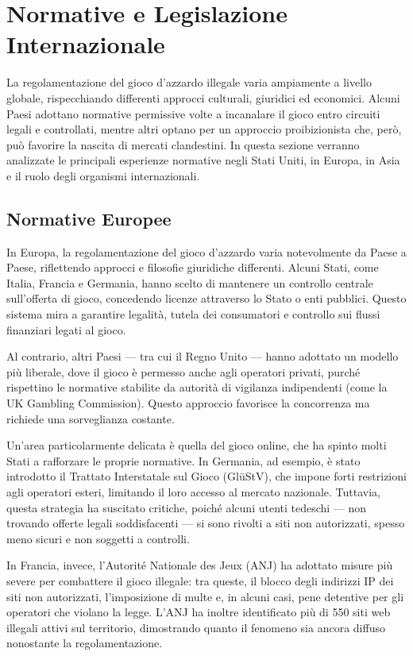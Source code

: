 \documentclass[a4paper,12pt]{article}
\begin{document}
\section{Normative e Legislazione Internazionale}

La regolamentazione del gioco d’azzardo illegale varia ampiamente a livello globale, rispecchiando differenti approcci culturali, giuridici ed economici. Alcuni Paesi adottano normative permissive volte a incanalare il gioco entro circuiti legali e controllati, mentre altri optano per un approccio proibizionista che, però, può favorire la nascita di mercati clandestini. In questa sezione verranno analizzate le principali esperienze normative negli Stati Uniti, in Europa, in Asia e il ruolo degli organismi internazionali.

\subsection{Normative Europee}

In Europa, la regolamentazione del gioco d’azzardo varia notevolmente da Paese a Paese, riflettendo approcci e filosofie giuridiche differenti. Alcuni Stati, come Italia, Francia e Germania, hanno scelto di mantenere un controllo centrale sull’offerta di gioco, concedendo licenze attraverso lo Stato o enti pubblici. Questo sistema mira a garantire legalità, tutela dei consumatori e controllo sui flussi finanziari legati al gioco.

Al contrario, altri Paesi — tra cui il Regno Unito — hanno adottato un modello più liberale, dove il gioco è permesso anche agli operatori privati, purché rispettino le normative stabilite da autorità di vigilanza indipendenti (come la UK Gambling Commission). Questo approccio favorisce la concorrenza ma richiede una sorveglianza costante.

Un’area particolarmente delicata è quella del gioco online, che ha spinto molti Stati a rafforzare le proprie normative. In Germania, ad esempio, è stato introdotto il Trattato Interstatale sul Gioco (GlüStV), che impone forti restrizioni agli operatori esteri, limitando il loro accesso al mercato nazionale. Tuttavia, questa strategia ha suscitato critiche, poiché alcuni utenti tedeschi — non trovando offerte legali soddisfacenti — si sono rivolti a siti non autorizzati, spesso meno sicuri e non soggetti a controlli.

In Francia, invece, l’Autorité Nationale des Jeux (ANJ) ha adottato misure più severe per combattere il gioco illegale: tra queste, il blocco degli indirizzi IP dei siti non autorizzati, l’imposizione di multe e, in alcuni casi, pene detentive per gli operatori che violano la legge. L’ANJ ha inoltre identificato più di 550 siti web illegali attivi sul territorio, dimostrando quanto il fenomeno sia ancora diffuso nonostante la regolamentazione.
\end{document}
